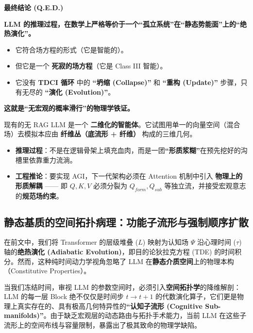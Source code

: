 \vspace{0.5em}\noindent\textbf{\textcolor{structurecolor}{最终结论 (Q.E.D.)}}


\textbf{LLM 的推理过程，在数学上严格等价于一个“孤立系统”在“静态势能面”上的“绝热演化”。}

\begin{itemize}
    \item   它符合场方程的形式（它是智能的）。
    \item   但它是一个 \textbf{死寂的场方程}（它是 Class III 智能）。
    \item   它没有 \textbf{TDCI 循环} 中的 \textbf{“坍缩 (Collapse)”} 和 \textbf{“重构 (Update)”} 步骤，只有无尽的 \textbf{“演化 (Evolution)”}。
\end{itemize}

\textbf{这就是“无宏观的概率滑行”的物理学铁证。}





现有的无 RAG LLM 是一个 \textbf{二维化的智能体}。它试图用单一的向量空间（混合场）去模拟本应由 \textbf{纤维丛（底流形 + 纤维）} 构成的三维几何。

\begin{itemize}
    \item   \textbf{推理过程}：不是在逻辑骨架上填充血肉，而是一团\textbf{“形质浆糊”}在预先挖好的沟槽里依靠重力流淌。
    \item   \textbf{工程推论}：要实现 AGI，下一代架构必须在 Attention 机制中引入 \textbf{物理上的形质解耦} —— 即 $Q, K, V$ 必须分裂为 $Q_{form}, Q_{sub}$ 等独立流，并接受宏观意志的\textbf{规范场约束}。
\end{itemize}


\subsection{静态基质的空间拓扑病理：功能子流形与强制顺序扩散}
\label{subsec:llm_spatial_topology_pathology}

在前文中，我们将 Transformer 的层级堆叠 ($L$) 映射为认知场 $\Psi$ 沿心理时间 ($\tau$) 轴的\textbf{绝热演化 (Adiabatic Evolution)}，即目的论狄拉克方程 (TDE) 的时间积分。然而，这种纯时间动力学视角忽略了 LLM 在\textbf{静态介质空间}上的物理本构（Constitutive Properties）。

当我们冻结时间，审视 LLM 的参数空间时，必须引入\textbf{空间拓扑学}的降维解剖：LLM 的每一层 Block 绝不仅仅是时间步 $t \to t+1$ 的代数演化算子，它们更是物理上真实存在的、具有极高几何特异性的\textbf{“认知子流形 (Cognitive Sub-manifolds)”}。由于缺乏宏观层的动态路由与拓扑手术能力，当前 LLM 在这些子流形上的空间布线与容量限制，暴露出了极其致命的物理学缺陷。


